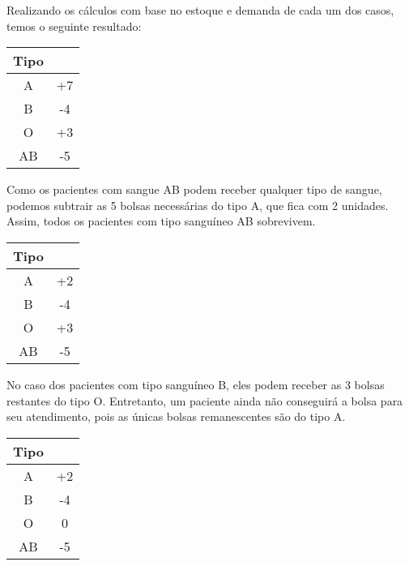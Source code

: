 \documentclass[]{article}
\begin{document}
Realizando os cálculos com base no estoque e demanda de cada um dos casos, temos o seguinte resultado:

\begin{center}
 \begin{tabular}{|| c | c ||} 
 \hline
 Tipo &  \\ [0.5ex] 
 \hline
 A  & +7 \\ 
 \hline
 B  & -4 \\
 \hline
 O  & +3 \\
 \hline
 AB & -5 \\ [1ex]
 \hline
\end{tabular}
\end{center}

Como os pacientes com sangue AB podem receber qualquer tipo de sangue, podemos subtrair as 5 bolsas necessárias do tipo A, que fica com 2 unidades. Assim, todos os pacientes com tipo sanguíneo AB sobrevivem.

\begin{center}
 \begin{tabular}{|| c | c ||} 
 \hline
 Tipo &  \\ [0.5ex] 
 \hline
 A  & +2 \\ 
 \hline
 B  & -4 \\
 \hline
 O  & +3 \\
 \hline
 AB & -5 \\ [1ex]
 \hline
\end{tabular}
\end{center}

No caso dos pacientes com tipo sanguíneo B, eles podem receber as 3 bolsas restantes do tipo O. Entretanto, um paciente ainda não conseguirá a bolsa para seu atendimento, pois as únicas bolsas remanescentes são do tipo A.

\begin{center}
 \begin{tabular}{|| c | c ||} 
 \hline
 Tipo &  \\ [0.5ex] 
 \hline
 A  & +2 \\ 
 \hline
 B  & -4 \\
 \hline
 O  & 0 \\
 \hline
 AB & -5 \\ [1ex]
 \hline
\end{tabular}
\end{center}
\end{document}
